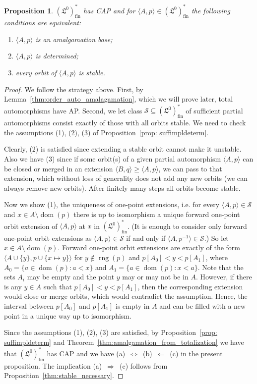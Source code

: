 \documentclass[10pt,a4paper]{article}
\newtheorem{prop}[tw]{Proposition}
\theoremstyle{definition}
\theoremstyle{remark}
\newcommand \seq [1]{\langle #1 \rangle}
\newcommand \dom {\operatorname{dom}}
\newcommand \rng {\operatorname{rng}}
\newcommand \Su {\mathscr{S}}
\newcommand \fin {{\operatorname{fin}}}
\newcommand \Lin {\mathfrak{L}}
\begin{document}
\begin{prop}\label{lo_totaliz}
    $(\Lin^0)^*_\fin$  has CAP and for $\seq{A,p}\in (\Lin^0)^*_\fin$ the following conditions are equivalent:
    \begin{enumerate}[label={\rm(\alph*)}]
        \item $\seq{A,p}$ is an amalgamation base;
        \item $\seq{A,p}$ is determined;  
        \item every orbit of $\seq{A,p}$ is stable.
    \end{enumerate}
\end{prop}

\begin{proof}
We follow the strategy above.
First, by Lemma~\ref{thm:order_auto_amalagamation}, which we will prove later, total automorphisms have AP.
Second, we let class $\Su \subseteq (\Lin^0)^*_\fin$ of sufficient partial automorphisms consist exactly of those with all orbits stable.
We need to check the assumptions (1), (2), (3) of Proposition~\ref{prop: suffimpldeterm}.

Clearly, (2) is satisfied since extending a stable orbit cannot make it unstable.
Also we have (3) since if some orbit(s) of a given partial automorphism $\seq{A, p}$ can be closed or merged in an extension $\seq{B, q} \geq \seq{A, p}$, we can pass to that extension, which without loss of generality does not add any new orbits (we can always remove new orbits).
After finitely many steps all orbits become stable.

Now we show (1), the uniqueness of one-point extensions, i.e. for every $\seq{A, p} \in \Su$ and $x \in A \setminus \dom(p)$ there is up to isomorphism a unique forward one-point orbit extension of $\seq{A, p}$ at $x$ in $(\Lin^0)^*_\fin$.
(It is enough to consider only forward one-point orbit extensions as $\seq{A, p} \in \Su$ if and only if $\seq{A, p^{-1}} \in \Su$.)
So let $x \in A \setminus \dom(p)$.
Forward one-point orbit extensions are exactly of the form $\seq{A \cup \{y\}, p \cup \{x \mapsto y\}}$ for $y \notin \rng(p)$ and $p[A_0] < y< p[A_1]$, where $A_0 = \{a \in \dom(p): a < x\}$ and $A_1 = \{a \in \dom(p): x < a\}$.
Note that the sets $A_i$ may be empty and the point $y$ may or may not be in $A$.
However, if there is any $y \in A$ such that $p[A_0] < y < p[A_1]$, then the corresponding extension would close or merge orbits, which would contradict the assumption.
Hence, the interval between $p[A_0]$ and $p[A_1]$ is empty in $A$ and can be filled with a new point in a unique way up to isomorphism.

Since the assumptions (1), (2), (3) are satisfied, by Proposition~\ref{prop: suffimpldeterm} and Theorem~\ref{thm:amalgamation_from_totalization} we have that $(\Lin^0)^*_\fin$ has CAP and we have (a)~$\Leftrightarrow$~(b)~$\Leftarrow$~(c) in the present proposition.
The implication (a)~$\Rightarrow$~(c) follows from Proposition~\ref{thm:stable_necessary}.
\end{proof}
\end{document}
